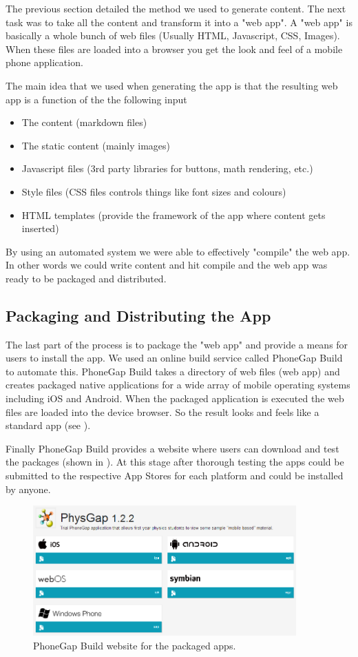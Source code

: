 \documentclass[12pt,a4paper]{article}  %
\begin{document}
The previous section detailed the method we used to generate content. The next task was to take all the content and transform it into a "web app". A "web app" is basically a whole bunch of web files (Usually HTML, Javascript, CSS, Images). When these files are loaded into a browser you get the look and feel of a mobile phone application. 

The main idea that we used when generating the app is that the resulting web app is a function of the the following input
\begin{itemize}
\item The content (markdown files)
\item The static content (mainly images)
\item Javascript files (3rd party libraries for buttons, math rendering, etc.)
\item Style files (CSS files controls things like font sizes and colours)
\item HTML templates (provide the framework of the app where content gets inserted)
\end{itemize}

By using an automated system we were able to effectively "compile" the web app. In other words we could write content and hit compile and the web app was ready to be packaged and distributed.

\subsection{Packaging and Distributing the App}

The last part of the process is to package the "web app" and provide a means for users to install the app. We used an online build service called PhoneGap Build \cite{phonegap} to automate this. PhoneGap Build takes a directory of web files (web app) and creates packaged native applications for a wide array of mobile operating systems including iOS and Android. When the packaged application is executed the web files are loaded into the device browser. So the result looks and feels like a standard app (see ).

Finally PhoneGap Build provides a website where users can download and test the packages (shown in ). At this stage after thorough testing the apps could be submitted to the respective App Stores for each platform and could be installed by anyone.

\begin{figure}[htb]
\centering
\includegraphics[width=0.9\textwidth]{phonegap.png}
\caption{PhoneGap Build website for the packaged apps.}
\label{fig:pg}
\end{figure}
\end{document}
